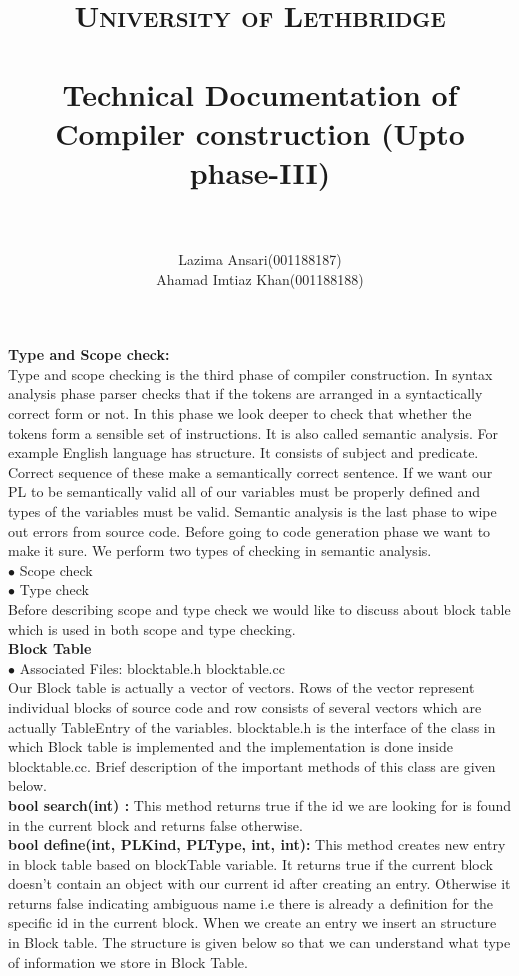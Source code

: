 \documentclass[paper=letter, fontsize=11pt]{scrartcl} %
\title{	
\normalfont \normalsize 
\textsc{University of Lethbridge} \\ [25pt] %
\horrule{0.5pt} \\[0.4cm] %
\huge Technical Documentation of Compiler construction (Upto phase-III)\\ %
\horrule{2pt} \\[0.5cm] %
}
\author{Lazima Ansari(001188187) \\ Ahamad Imtiaz Khan(001188188)} %
\begin{document}
\maketitle
\newpage

{\bf {\huge Type and Scope check:}}\\
Type and scope checking is the third phase of compiler construction. In syntax analysis phase parser checks that if the tokens are arranged in a syntactically correct form or not. In this phase we look deeper to check that whether the tokens form a sensible set of instructions. It is also called semantic analysis. For example English language has structure. It consists of subject and predicate. Correct sequence of these make a semantically correct sentence. If we want our PL to be semantically valid all of our variables must be properly defined and types of the variables must be valid. Semantic analysis is the last phase to wipe out errors from source code. Before going to code generation phase we want to make it sure. We perform two types of checking in semantic analysis.\\

$\bullet$ Scope check\\
$\bullet$ Type check\\

Before describing scope and type check we would like to discuss about block table which is used in both scope and type checking.\\

{\bf Block Table}\\
$\bullet$ Associated Files: blocktable.h blocktable.cc\\
Our Block table is actually a vector of vectors. Rows of the vector represent individual blocks of source code and row consists of several vectors which are actually TableEntry of the variables. blocktable.h is the interface of the class in which Block table is implemented and the implementation is done inside blocktable.cc. Brief description of the important methods of this class are given below.\\
{\bf bool search(int) :} This method returns true if the id we are looking for is found in the current block and returns false otherwise.\\
{\bf bool define(int, PL\textunderscore Kind, PL\textunderscore Type, int, int):} This method creates new entry in block table based on blockTable variable. It returns true if the current block doesn't contain an object with our current id after creating an entry. Otherwise it returns false indicating ambiguous name i.e there is already a definition for the specific id 
in the current block. When we create an entry we insert an structure in Block table. The structure is given below so that we can understand what type of information we store in Block Table.\\
\end{document}
